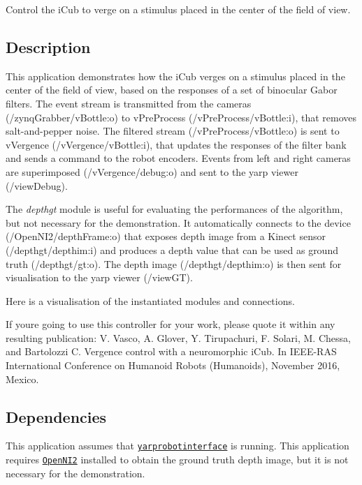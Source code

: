 Control the i\+Cub to verge on a stimulus placed in the center of the field of view.

\subsection*{Description}

This application demonstrates how the i\+Cub verges on a stimulus placed in the center of the field of view, based on the responses of a set of binocular Gabor filters. The event stream is transmitted from the cameras (/zynq\+Grabber/v\+Bottle\+:o) to v\+Pre\+Process (/v\+Pre\+Process/v\+Bottle\+:i), that removes salt-\/and-\/pepper noise. The filtered stream (/v\+Pre\+Process/v\+Bottle\+:o) is sent to v\+Vergence (/v\+Vergence/v\+Bottle\+:i), that updates the responses of the filter bank and sends a command to the robot encoders. Events from left and right cameras are superimposed (/v\+Vergence/debug\+:o) and sent to the yarp viewer (/view\+Debug).

The {\itshape depthgt} module is useful for evaluating the performances of the algorithm, but not necessary for the demonstration. It automatically connects to the device (/\+Open\+N\+I2/depth\+Frame\+:o) that exposes depth image from a Kinect sensor (/depthgt/depthim\+:i) and produces a depth value that can be used as ground truth (/depthgt/gt\+:o). The depth image (/depthgt/depthim\+:o) is then sent for visualisation to the yarp viewer (/view\+GT).

Here is a visualisation of the instantiated modules and connections.



If you\textquotesingle{}re going to use this controller for your work, please quote it within any resulting publication\+: V. Vasco, A. Glover, Y. Tirupachuri, F. Solari, M. Chessa, and Bartolozzi C. Vergence control with a neuromorphic i\+Cub. In I\+E\+E\+E-\/\+R\+AS International Conference on Humanoid Robots (Humanoids), November 2016, Mexico.

\subsection*{Dependencies}

This application assumes that \href{http://www.yarp.it/yarprobotinterface.html}{\tt yarprobotinterface} is running. This application requires \href{http://wiki.icub.org/wiki/OpenNI2}{\tt Open\+N\+I2} installed to obtain the ground truth depth image, but it is not necessary for the demonstration.

